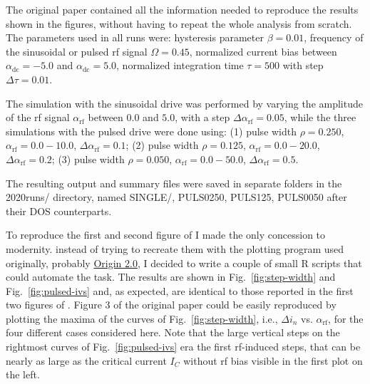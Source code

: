 The original paper  contained all the information needed to reproduce the results shown in the figures, without having to repeat the whole analysis from scratch. 
The parameters used in all runs were: hysteresis parameter $\beta = 0.01$, frequency of the sinusoidal or pulsed  rf signal $\Omega = 0.45$, normalized current bias between $\alpha_\mathrm{dc} = -5.0$ and $\alpha_\mathrm{dc} = 5.0$, normalized integration time $\tau = 500$ with step $\Delta \tau = 0.01$. 

The simulation with the sinusoidal drive was performed by varying the amplitude of the rf signal $\alpha_\mathrm{rf}$ between $0.0$ and $5.0$, with a step $\Delta \alpha_\mathrm{rf} = 0.05$, while the three simulations with the pulsed drive were done using: 
(1) pulse width $\rho = 0.250$, $\alpha_\mathrm{rf} = 0.0 - 10.0$, $\Delta \alpha_\mathrm{rf} = 0.1$;
(2) pulse width $\rho = 0.125$, $\alpha_\mathrm{rf} = 0.0 - 20.0$, $\Delta \alpha_\mathrm{rf} = 0.2$;
(3) pulse width $\rho = 0.050$, $\alpha_\mathrm{rf} = 0.0 - 50.0$, $\Delta \alpha_\mathrm{rf} = 0.5$.

The resulting output and summary files were saved in separate folders in the \textsf{2020runs/} directory, named \textsf{SINGLE/}, \textsf{PULS0250}, \textsf{PULS125}, \textsf{PULS0050} after their DOS counterparts.

To reproduce the first and second figure of \cite{Maggi:1996} I made the only concession to modernity. instead of trying to recreate them with the plotting program used originally, probably \href{https://www.originlab.com}{Origin 2.0}, I decided to write a couple of small R scripts that could automate the task.
The results are shown in Fig.~\ref{fig:step-width} and Fig.~\ref{fig:pulsed-ivs} and, as expected, are identical to those reported in the first two figures of \cite{Maggi:1996}. 
Figure 3 of the original paper could be easily reproduced by plotting the maxima of the curves of Fig.~\ref{fig:step-width}, i.e., $\Delta i_n$ vs. $\alpha_\mathrm{rf}$, for the four different cases considered here.
Note that the large vertical steps on the rightmost curves of Fig.~\ref{fig:pulsed-ivs} era the first rf-induced steps, that can be nearly as large as the critical current $I_C$ without rf bias visible in the first plot on the left.

